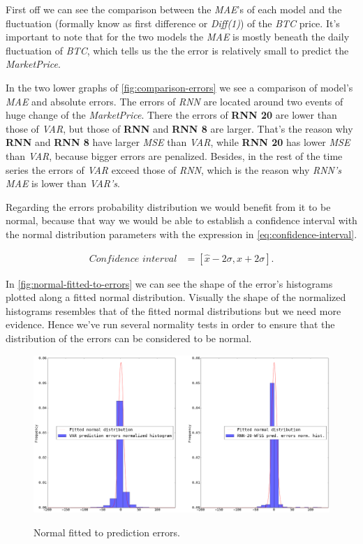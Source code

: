 First off we can see the comparison between the \textit{MAE}'s of each
model and the fluctuation (formally know as first difference or
\textit{Diff(1)}) of the \textit{BTC} price. It's important to note
that for the two models the \textit{MAE} is mostly beneath the daily
fluctuation of \textit{BTC}, which tells us the the error is
relatively small to predict the \textit{MarketPrice}.

In the two lower graphs of \autoref{fig:comparison-errors} we see a
comparison of model's \textit{MAE} and absolute errors. The errors of
\textit{RNN} are located around two events of huge change of the
\textit{MarketPrice}. There the errors of \textbf{RNN 20} are lower
than those of \textit{VAR}, but those of \textbf{RNN} and \textbf{RNN
  8} are larger. That's the reason why \textbf{RNN} and \textbf{RNN 8}
have larger \textit{MSE} than \textit{VAR}, while \textbf{RNN 20} has
lower \textit{MSE} than \textit{VAR}, because bigger errors are
penalized. Besides, in the rest of the time series the errors of
\textit{VAR} exceed those of \textit{RNN}, which is the reason why
\textit{RNN's} \textit{MAE} is lower than \textit{VAR's}.

Regarding the errors probability distribution we would benefit from it
to be normal, because that way we would be able to establish a
confidence interval with the normal distribution parameters with the
expression in \autoref{eq:confidence-interval}.

\begin{equation}
  \begin{aligned}
    \label{eq:confidence-interval}
    \textit{Confidence interval} & =
    [ \hat{x} - 2 \sigma, \hat{x} + 2 \sigma ].
  \end{aligned}
\end{equation}

In \autoref{fig:normal-fitted-to-errors} we can see the shape of the
error's histograms plotted along a fitted normal distribution.
Visually the shape of the normalized histograms resembles that of the
fitted normal distributions but we need more evidence. Hence we've run
several normality tests in order to ensure that the distribution of
the errors can be considered to be normal.

\begin{figure}[bth]
  \myfloatalign
  {
    \includegraphics[width=1\linewidth]
    {gfx/normal-fitted-to-errors}}
  \caption{Normal fitted to prediction errors.}
  \label{fig:normal-fitted-to-errors}
\end{figure}

